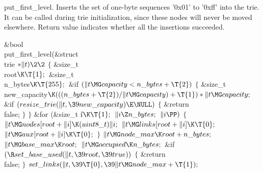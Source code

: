 put\_first\_level.
Inserts the set of one-byte sequences '0x01' to '0xff' into the trie. It can be
called during trie initialization,
since these nodes will never be moved elsewhere. Return value indicates whether
all the insertions succeeded.

\Y\B\1\1\&{bool} \\{put\_first\_level}(\&{struct} \\{trie} ${}{*}\|t)\2\2{}$\6
${}\{{}$\1\6
\&{size\_t} \\{root}${}\K\T{1};{}$\6
\&{size\_t} \\{n\_bytes}${}\K\T{255};{}$\7
\&{if} ${}(\|t\MG\\{capacity}<\\{n\_bytes}+\T{2}){}$\5
${}\{{}$\1\6
\&{size\_t} \\{new\_capacity}${}\K(((\\{n\_bytes}+\T{2})/\|t\MG\\{capacity})+%
\T{1})*\|t\MG\\{capacity};{}$\7
\&{if} ${}(\\{resize\_trie}(\|t,\39\\{new\_capacity})\E\NULL){}$\5
${}\{{}$\1\6
\&{return} \\{false};\6
\4${}\}{}$\2\6
\4${}\}{}$\2\6
\&{for} (\&{size\_t} \|i${}\K\T{1};{}$ ${}\|i\Z\\{n\_bytes};{}$ ${}\|i\PP){}$\5
${}\{{}$\1\6
${}\|t\MG\\{nodes}[\\{root}+\|i]\K(\\{uint8\_t})\|i;{}$\6
${}\|t\MG\\{links}[\\{root}+\|i]\K\T{0};{}$\6
${}\|t\MG\\{aux}[\\{root}+\|i]\K\T{0};{}$\6
\4${}\}{}$\2\6
${}\|t\MG\\{node\_max}\K\\{root}+\\{n\_bytes};{}$\6
${}\|t\MG\\{base\_max}\K\\{root};{}$\6
${}\|t\MG\\{occupied}\K\\{n\_bytes};{}$\6
\&{if} ${}(\R\\{set\_base\_used}(\|t,\39\\{root},\39\\{true})){}$\5
${}\{{}$\1\6
\&{return} \\{false};\6
\4${}\}{}$\2\6
${}\\{set\_links}(\|t,\39\T{0},\39\|t\MG\\{node\_max}+\T{1});{}$\6
